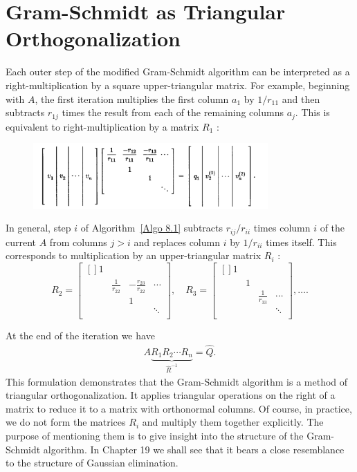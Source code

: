 \section{Gram-Schmidt as Triangular Orthogonalization}
Each outer step of the modified Gram-Schmidt algorithm can be interpreted as a right-multiplication by a square upper-triangular matrix. For example, beginning with $A$, the first iteration multiplies the first column $a_1$ by $1 / r_{11}$ and then subtracts $r_{1 j}$ times the result from each of the remaining columns $a_j$. This is equivalent to right-multiplication by a matrix $R_1$ :
\begin{figure}[H]
    \centering
    \includegraphics[width=0.8\textwidth]{figures/8-2.png}
\end{figure}
In general, step $i$ of Algorithm~\ref{Algo 8.1} subtracts $r_{i j} / r_{i i}$ times column $i$ of the current $A$ from columns $j>i$ and replaces column $i$ by $1 / r_{i i}$ times itself. This corresponds to multiplication by an upper-triangular matrix $R_i$ :
\[
    R_2 = \begin{bmatrix}[] 
        1 &  &  &   \\
         & \frac{1}{r_{ 22 } } & -\frac{r_{23}}{r_{22}} &  \cdots \\
         &  & 1 &   \\
         &  &  & \ddots  \\
    \end{bmatrix}, \quad R_3 = \begin{bmatrix}[] 
         1&  &  &   \\
         &1  &  &   \\
         &  &\frac{1}{r_{ 33 } }    &\cdots   \\
         &  &  &  \ddots \\
    \end{bmatrix} , \ldots . 
\]

At the end of the iteration we have
\begin{align*}
A \underbrace{R_1 R_2 \cdots R_n}_{\hat{R}^{-1}}=\hat{Q} .
\end{align*}
This formulation demonstrates that the Gram-Schmidt algorithm is a method of triangular orthogonalization. It applies triangular operations on the right of a matrix to reduce it to a matrix with orthonormal columns. Of course, in practice, we do not form the matrices $R_i$ and multiply them together explicitly. The purpose of mentioning them is to give insight into the structure of the Gram-Schmidt algorithm. In Chapter 19 we shall see that it bears a close resemblance to the structure of Gaussian elimination.